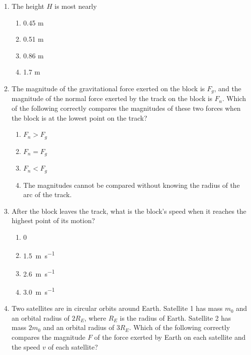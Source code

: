 \documentclass[11pt]{article}
\begin{document}
\begin{multicols}{2}
  \begin{enumerate}[leftmargin=18pt,resume]
  \item The height $H$ is most nearly
    \begin{enumerate}[nosep,leftmargin=18pt,label=(\Alph*)]
    \item 0.45 m
    \item 0.51 m
    \item 0.86 m
    \item 1.7 m
    \end{enumerate}
    \label{first}
    
  \item The magnitude of the gravitational force exerted on the block is $F_g$,
    and the magnitude of the normal force exerted by the track on the block is
    $F_n$. Which of the following correctly compares the magnitudes of these
    two forces when the block is at the lowest point on the track?
    \begin{enumerate}[nosep,leftmargin=18pt,label=(\Alph*)]
    \item $F_n>F_g$
    \item $F_n=F_g$
    \item $F_n<F_g$
    \item The magnitudes cannot be compared without knowing the radius of the
      arc of the track.
    \end{enumerate}
    \vspace{.7in}
    
  \item After the block leaves the track, what is the block's speed when it
    reaches the highest point of its motion?
    \begin{enumerate}[nosep,leftmargin=18pt,label=(\Alph*)]
    \item 0
    \item\SI{1.5}{\metre\per\second} 
    \item\SI{2.6}{\metre\per\second}
    \item\SI{3.0}{\metre\per\second}
    \end{enumerate}
    \label{last}
    \vspace{.7in}
    
  \item Two satellites are in circular orbits around Earth. Satellite 1 has
    mass $m_0$ and an orbital radius of $2R_E$, where $R_E$ is the radius of
    Earth. Satellite 2 has mass $2m_0$ and an orbital radius of $3R_E$. Which
    of the following correctly compares the magnitude $F$ of the force exerted
    by Earth on each satellite and the speed $v$ of each satellite?


\end{enumerate}
\end{multicols}
\end{document}
